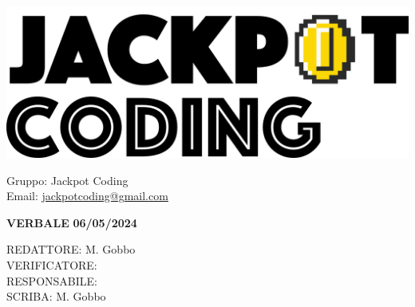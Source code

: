\documentclass[5pt]{article}
\begin{document}
\begin{minipage}[t]{0.50\textwidth}
    \begin{flushleft}
        \hspace{10pt}
        \includegraphics[scale=0.65]{jackpot-logo.png} 
    \end{flushleft}
\end{minipage}
\hspace{-60pt} %
\begin{flushright}
    \begin{minipage}[t]{0.50\textwidth}
        \begin{flushright}
            Gruppo: {\Large Jackpot Coding}\\
            Email: \href{mailto:jackpotcoding@gmail.com}{jackpotcoding@gmail.com}
        \end{flushright}
    \end{minipage}
\end{flushright}

\vspace{20pt}

\begin{center}
    \textbf{\large VERBALE }
    \textbf{\large 06/05/2024} \\
\end{center}

\vspace{13pt}

\begin{flushleft}
    \begin{spacing}{1.5}
        REDATTORE: M. Gobbo\\ 
        VERIFICATORE: \\ 
        RESPONSABILE: \\ 
        \vspace{7pt}
        SCRIBA: M. Gobbo\\ 
    \end{spacing}
\end{flushleft}
\end{document}
